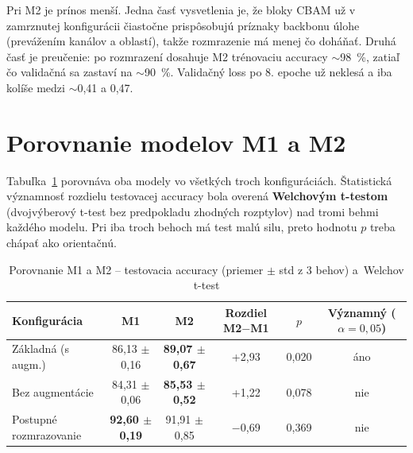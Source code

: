 Pri M2 je prínos menší. Jedna časť vysvetlenia je, že bloky CBAM už
v zamrznutej konfigurácii čiastočne prispôsobujú príznaky backbonu úlohe
(prevážením kanálov a oblastí), takže rozmrazenie má menej čo doháňať.
Druhá časť je preučenie: po rozmrazení dosahuje M2 trénovaciu accuracy
$\sim$98~\%, zatiaľ čo validačná sa zastaví na $\sim$90~\%. Validačný loss
po 8. epoche už neklesá a iba kolíše medzi $\sim$0,41 a 0,47.



\section{Porovnanie modelov M1 a M2}
\label{sec:m1m2}

Tabuľka~\ref{tab:m1m2} porovnáva oba modely vo všetkých troch
konfiguráciách. Štatistická významnosť rozdielu testovacej accuracy bola
overená \textbf{Welchovým t-testom} (dvojvýberový t-test bez predpokladu
zhodných rozptylov) nad tromi behmi každého modelu. Pri iba troch behoch
má test malú silu, preto hodnotu $p$ treba chápať ako orientačnú.

\begin{table}[H]
    \centering
    \caption{Porovnanie M1 a M2 -- testovacia accuracy (priemer $\pm$ std z 3 behov) a~Welchov t-test}
    \label{tab:m1m2}
    \footnotesize
    \begin{tabular}{lccccc}
        \toprule
        Konfigurácia & M1 & M2 & Rozdiel M2$-$M1 & $p$ & Významný ($\alpha=0{,}05$) \\
        \midrule
        Základná (s augm.)      & 86,13 $\pm$ 0,16 & \textbf{89,07 $\pm$ 0,67} & +2,93 & 0,020 & áno \\
        Bez augmentácie         & 84,31 $\pm$ 0,06 & \textbf{85,53 $\pm$ 0,52} & +1,22 & 0,078 & nie \\
        Postupné rozmrazovanie  & \textbf{92,60 $\pm$ 0,19} & 91,91 $\pm$ 0,85 & $-$0,69 & 0,369 & nie \\
        \bottomrule
    \end{tabular}
\end{table}


